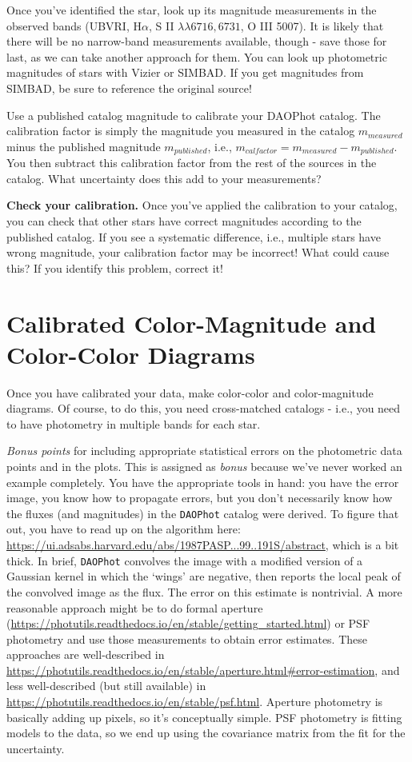 \documentclass[11pt]{article}
\begin{document}
Once you've identified the star, look up its magnitude measurements
in the observed bands (UBVRI, H$\alpha$, S II $\lambda\lambda6716,6731$, O III 5007).
It is likely that there will be no narrow-band measurements available, though - save those for last,
as we can take another approach for them.
You can look up photometric magnitudes of stars with Vizier or SIMBAD.  If you get magnitudes from
SIMBAD, be sure to reference the original source!


Use a published catalog magnitude to calibrate your DAOPhot catalog.
The calibration factor is simply the magnitude you measured in the catalog $m_{measured}$ 
minus the published magnitude $m_{published}$, i.e., $m_{calfactor} = m_{measured} - m_{published}$.
You then subtract this calibration factor from the rest of the sources in the catalog.
What uncertainty does this add to your measurements?

\textbf{Check your calibration.}  Once you've applied the calibration to your catalog, you can check
that other stars have correct magnitudes according to the published catalog.  If you see a systematic difference,
i.e., multiple stars have wrong magnitude, your calibration factor may be incorrect!
What could cause this?  If you identify this problem, correct it!

\section{Calibrated Color-Magnitude and Color-Color Diagrams}

Once you have calibrated your data, make color-color and color-magnitude diagrams.
Of course, to do this, you need cross-matched catalogs - i.e., you need to have photometry in multiple bands
for each star.

\emph{Bonus points} for including appropriate statistical errors on the photometric data points and in the plots.
This is assigned as \emph{bonus} because we've never worked an example completely.  You have the appropriate
tools in hand: you have the error image, you know how to propagate errors, but you don't necessarily know
how the fluxes (and magnitudes) in the \texttt{DAOPhot} catalog were derived.
To figure that out, you have to read up on the algorithm here: \url{https://ui.adsabs.harvard.edu/abs/1987PASP...99..191S/abstract},
which is a bit thick.  In brief, \texttt{DAOPhot} convolves the image with a modified version of a Gaussian kernel in which the `wings'
are negative, then reports the local peak of the convolved image as the flux.  The error on this estimate is nontrivial.
A more reasonable approach might be to do formal aperture
(\url{https://photutils.readthedocs.io/en/stable/getting_started.html}) or PSF
photometry and use those measurements to obtain error estimates.
These approaches are well-described in \url{https://photutils.readthedocs.io/en/stable/aperture.html#error-estimation},
and less well-described (but still available) in \url{https://photutils.readthedocs.io/en/stable/psf.html}.
Aperture photometry is basically adding up pixels, so it's conceptually simple.  PSF photometry is fitting models to the data,
so we end up using the covariance matrix from the fit for the uncertainty.
\end{document}
